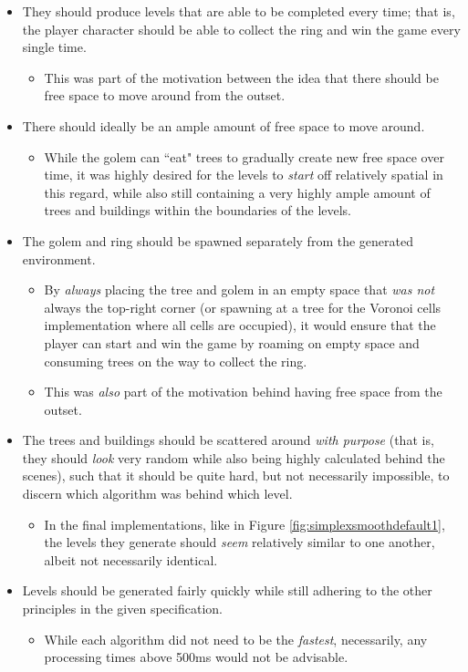 \begin{itemize}
    \item They should produce levels that are able to be completed every time; that is, the player character should be able to collect the ring and win the game every single time.
    \begin{itemize}
        \item This was part of the motivation between the idea that there should be free space to move around from the outset.
    \end{itemize}
    \item There should ideally be an ample amount of free space to move around.
    \begin{itemize}
        \item While the golem can ``eat" trees to gradually create new free space over time, it was highly desired for the levels to \textit{start} off relatively spatial in this regard, while also still containing a very highly ample amount of trees and buildings within the boundaries of the levels.
    \end{itemize}
    \item The golem and ring should be spawned separately from the generated environment.
    \begin{itemize}
        \item By \textit{always} placing the tree and golem in an empty space that \textit{was not} always the top-right corner (or spawning at a tree for the Voronoi cells implementation where all cells are occupied), it would ensure that the player can start and win the game by roaming on empty space and consuming trees on the way to collect the ring.
        \item This was \textit{also} part of the motivation behind having free space from the outset.
    \end{itemize}
    \item The trees and buildings should be scattered around \textit{with purpose} (that is, they should \textit{look} very random while also being highly calculated behind the scenes), such that it should be quite hard, but not necessarily impossible, to discern which algorithm was behind which level.
    \begin{itemize}
        \item In the final implementations, like in Figure \ref{fig:simplexsmoothdefault1}, the levels they generate should \textit{seem} relatively similar to one another, albeit not necessarily identical.
    \end{itemize}
    \item Levels should be generated fairly quickly while still adhering to the other principles in the given specification.
    \begin{itemize}
        \item While each algorithm did not need to be the \textit{fastest}, necessarily, any processing times above 500ms would not be advisable.
    \end{itemize}
\end{itemize}

